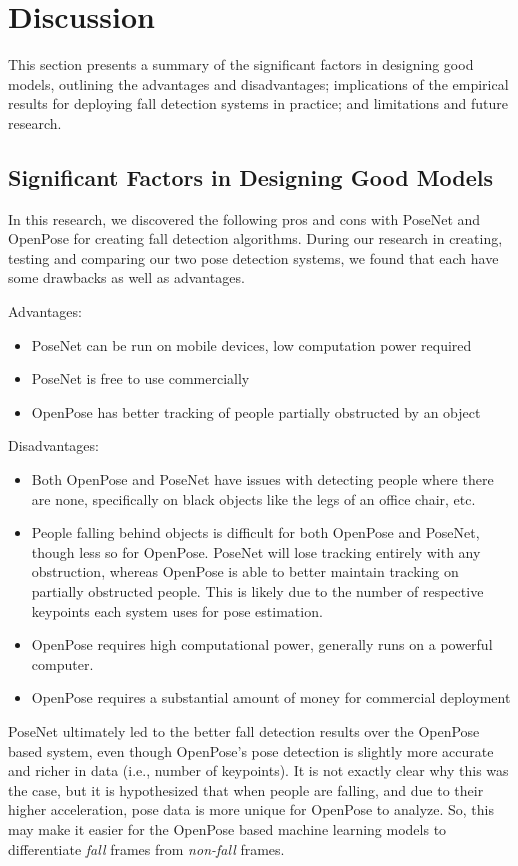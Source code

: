 \chapter{Discussion}
This section presents a summary of the significant factors in designing good models, outlining the advantages and disadvantages; implications of the empirical results for deploying fall detection systems in practice; and limitations and future research.

\section{Significant Factors in Designing Good Models}

In this research, we discovered the following pros and cons with PoseNet and OpenPose for creating fall detection algorithms. During our research in creating, testing and comparing our two pose detection systems, we found that each have some drawbacks as well as advantages.

Advantages:
\begin{itemize}
    \item PoseNet can be run on mobile devices, low computation power required
    \item PoseNet is free to use commercially
    \item OpenPose has better tracking of people partially obstructed by an object
\end{itemize}

Disadvantages:
\begin{itemize}
    \item Both OpenPose and PoseNet have issues with detecting people where there are none, specifically on black objects like the legs of an office chair, etc.
    \item People falling behind objects is difficult for both OpenPose and PoseNet, though less so for OpenPose. PoseNet will lose tracking entirely with any obstruction, whereas OpenPose is able to better maintain tracking on partially obstructed people.  This is likely due to the number of respective keypoints each system uses for pose estimation.
    \item OpenPose requires high computational power, generally runs on a powerful computer.
    \item OpenPose requires a substantial amount of money for commercial deployment
\end{itemize}


PoseNet ultimately led to the better fall detection results over the OpenPose based system, even though OpenPose’s pose detection is slightly more accurate and richer in data (i.e., number of keypoints). It is not exactly clear why this was the case, but it is hypothesized that when people are falling, and due to their higher acceleration, pose data is more unique for OpenPose to analyze. So, this may make it easier for the OpenPose based machine learning models to differentiate \textit{fall} frames from \textit{non-fall} frames.


